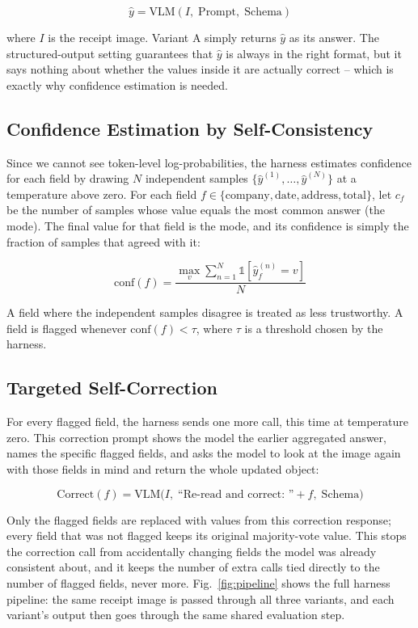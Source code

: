 \documentclass[conference]{IEEEtran}
\begin{document}
\[
\hat{y} = \text{VLM}(I,\; \text{Prompt},\; \text{Schema})
\]

where \(I\) is the receipt image. Variant A simply returns \(\hat{y}\) as its answer. The structured-output setting guarantees that \(\hat{y}\) is always in the right format, but it says nothing about whether the values inside it are actually correct -- which is exactly why confidence estimation is needed.

\subsection{Confidence Estimation by Self-Consistency}
Since we cannot see token-level log-probabilities, the harness estimates confidence for each field by drawing \(N\) independent samples \(\{\hat{y}^{(1)}, \ldots, \hat{y}^{(N)}\}\) at a temperature above zero. For each field \(f \in \{\text{company}, \text{date}, \text{address}, \text{total}\}\), let \(c_f\) be the number of samples whose value equals the most common answer (the mode). The final value for that field is the mode, and its confidence is simply the fraction of samples that agreed with it:

\[
\text{conf}(f) = \frac{\max_v \sum_{n=1}^{N} \mathbb{1}[\hat{y}^{(n)}_f = v]}{N}
\]

A field where the independent samples disagree is treated as less trustworthy. A field is flagged whenever \(\text{conf}(f) < \tau\), where \(\tau\) is a threshold chosen by the harness.

\subsection{Targeted Self-Correction}
For every flagged field, the harness sends one more call, this time at temperature zero. This correction prompt shows the model the earlier aggregated answer, names the specific flagged fields, and asks the model to look at the image again with those fields in mind and return the whole updated object:

\[
\text{Correct}(f) = \text{VLM}\big(I,\; \text{``Re-read and correct: ''} + f,\; \text{Schema}\big)
\]

Only the flagged fields are replaced with values from this correction response; every field that was not flagged keeps its original majority-vote value. This stops the correction call from accidentally changing fields the model was already consistent about, and it keeps the number of extra calls tied directly to the number of flagged fields, never more. Fig.~\ref{fig:pipeline} shows the full harness pipeline: the same receipt image is passed through all three variants, and each variant's output then goes through the same shared evaluation step.
\end{document}
